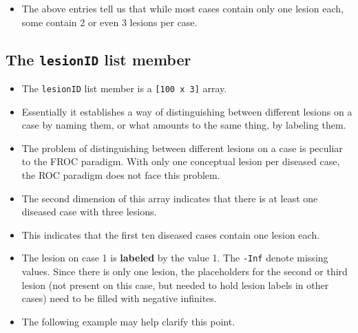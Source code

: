\documentclass[]{book}
\newenvironment{Shaded}{\begin{snugshade}}{\end{snugshade}}
\newcommand{\CommentTok}[1]{\textcolor[rgb]{0.56,0.35,0.01}{\textit{#1}}}
\newcommand{\DecValTok}[1]{\textcolor[rgb]{0.00,0.00,0.81}{#1}}
\newcommand{\NormalTok}[1]{#1}
\newcommand{\OperatorTok}[1]{\textcolor[rgb]{0.81,0.36,0.00}{\textbf{#1}}}
\providecommand{\tightlist}{%
  \setlength{\itemsep}{0pt}\setlength{\parskip}{0pt}}
\begin{document}
\begin{itemize}
\tightlist
\item
  The above entries tell us that while most cases contain only one lesion each, some contain 2 or even 3 lesions per case.
\end{itemize}

\hypertarget{the-lesionid-list-member}{%
\subsection{\texorpdfstring{The \texttt{lesionID} list member}{The lesionID list member}}\label{the-lesionid-list-member}}

\begin{itemize}
\tightlist
\item
  The \texttt{lesionID} list member is a \texttt{{[}100\ x\ 3{]}} array.
\item
  Essentially it establishes a way of distinguishing between different lesions on a case by naming them, or what amounts to the same thing, by labeling them.
\item
  The problem of distinguishing between different lesions on a case is peculiar to the FROC paradigm. With only one conceptual lesion per diseased case, the ROC paradigm does not face this problem.
\item
  The second dimension of this array indicates that there is at least one diseased case with three lesions.
\end{itemize}

\begin{Shaded}
\end{Shaded}

\begin{itemize}
\tightlist
\item
  This indicates that the first ten diseased cases contain one lesion each.
\item
  The lesion on case 1 is \textbf{labeled} by the value 1. The \texttt{-Inf} denote missing values. Since there is only one lesion, the placeholders for the second or third lesion (not present on this case, but needed to hold lesion labels in other cases) need to be filled with negative infinites.
\item
  The following example may help clarify this point.
\end{itemize}
\end{document}

